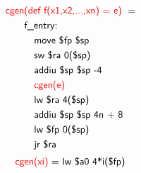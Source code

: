 \begin{equation*}\begin{split}
\textsf{\color{red}cgen}&\textsf{\color{red}(def f(x1,x2,...,xn) = e) }=\\
&\textsf{f\_entry:}\\
&\quad\textsf{move \$fp \$sp}\\
&\quad\textsf{sw \$ra 0(\$sp)}\\
&\quad\textsf{addiu \$sp \$sp -4}\\
&\quad\textsf{\color{red}cgen(e)}\\
&\quad\textsf{lw \$ra 4(\$sp)}\\
&\quad\textsf{addiu \$sp \$sp 4n + 8}\\
&\quad\textsf{lw \$fp 0(\$sp)}\\
&\quad\textsf{jr \$ra}\\
\end{split}\end{equation*}
\begin{equation*}
\textsf{\color{red}cgen(xi)}\textsf{ = lw \$a0 4*i(\$fp)}
\end{equation*}

\ifx\PREAMBLE\undefined

\fi